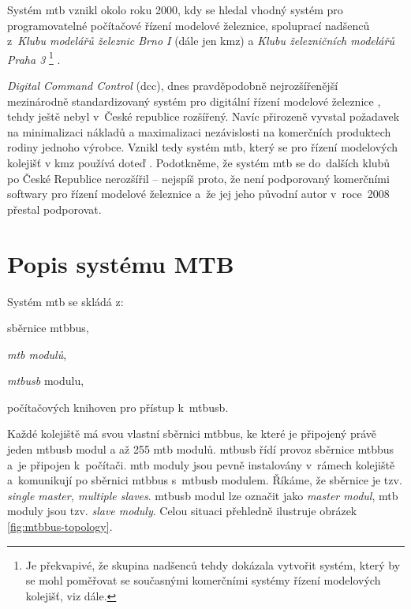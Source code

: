 Systém \gls{mtb} vznikl okolo roku 2000, kdy se hledal vhodný systém pro
programovatelné počítačové řízení modelové železnice, spoluprací nadšenců
z~\textit{Klubu modelářů železnic Brno I} (dále jen \gls{kmz}) a \textit{Klubu
železničních modelářů Praha 3} \footnote{Je překvapivé, že
skupina nadšenců tehdy dokázala vytvořit systém, který by se mohl poměřovat se
současnými komerčními systémy řízení modelových kolejišť, viz dále.} \cite{mtb:web}.

\textit{Digital Command Control} (\gls{dcc}), dnes pravděpodobně
nejrozšířenější\footnotemark\\mezinárodně standardizovaný systém pro digitální
řízení modelové železnice \cite{dcc_intro:web}, tehdy ještě nebyl v~České republice
rozšířený. Navíc přirozeně vyvstal požadavek na minimalizaci nákladů
a maximalizaci nezávislosti na komerčních produktech rodiny jednoho výrobce. Vznikl
tedy systém \gls{mtb}, který se pro řízení modelových kolejišť v \gls{kmz}
používá doteď \cite{kmz_rizeni:web}. Podotkněme, že systém \gls{mtb} se
do~dalších klubů po České Republice nerozšířil – nejspíš proto, že není
podporovaný komerčními softwary pro řízení modelové železnice a~že jej jeho
původní autor v~roce~2008 přestal podporovat.


\section{Popis systému MTB} \label{sec:mtbbus}

Systém \gls{mtb} se skládá z:

\begin{compactenum}
\item sběrnice \gls{mtbbus},
\item \textit{\gls{mtb} modulů},
\item \textit{\gls{mtbusb}} modulu,
\item počítačových knihoven pro přístup k~\gls{mtbusb}.
\end{compactenum}

Každé kolejiště má svou vlastní sběrnici \gls{mtbbus}, ke které je připojený
právě jeden \gls{mtbusb} modul a až 255 \gls{mtb} modulů.
\gls{mtbusb} řídí provoz sběrnice \gls{mtbbus} a~je připojen k~počítači.
\gls{mtb} moduly jsou pevně instalovány v~rámech kolejiště a~komunikují po
sběrnici \gls{mtbbus} s~\gls{mtbusb} modulem. Říkáme, že sběrnice je tzv.
\textit{single master, multiple slaves}. \gls{mtbusb} modul lze označit jako
\textit{master modul}, \gls{mtb} moduly jsou tzv. \textit{slave moduly}.
Celou situaci přehledně ilustruje obrázek \ref{fig:mtbbus-topology}.

